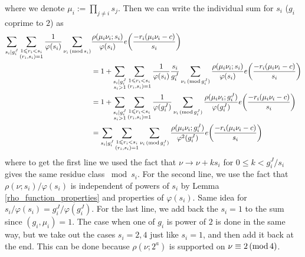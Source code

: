 \documentclass[12pt]{amsart}
\theoremstyle{definition}
\theoremstyle{definition}
\theoremstyle{remark}
\numberwithin{equation}{section}
\renewcommand{\leq}{\leqslant}
\renewcommand{\mod}[1]{\,({\rm mod}\,#1)}
\begin{document}
where we denote $\mu_i :=\prod_{j\not=i}s_j$. Then we can write the individual sum for $s_i$ ($g_i$ coprime to $2$) as
\begin{align*}
 \sum_{\substack{s_i| g_i^J}} \sum_{\substack{1\leq r_i < s_i \\ (r_i,s_i)=1}} \frac{1}{\varphi(s_i)} \sum_{\nu_i \mod{s_i}} &\frac{\rho(\mu_i\nu_i; s_i)}{\varphi(s_i)} e\bigg(\frac{-r_i(\mu_i\nu_i-c)}{s_i} \bigg) \\
 &= 1 + \sum_{\substack{s_i| g_i^J \\ s_i>1}} \sum_{\substack{1\leq r_i < s_i \\ (r_i,s_i)=1}} \frac{1}{\varphi(s_i)} \frac{s_i}{g_i^J} \sum_{\nu_i \mod{g_i^J}} \frac{\rho(\mu_i\nu_i;s_i)}{\varphi(s_i)} e\bigg(\frac{-r_i (\mu_i\nu_i-c)}{s_i} \bigg)  \\
&= 1 + \sum_{\substack{s_i| g_i^J \\ s_i>1}} \sum_{\substack{1\leq r_i < s_i \\ (r_i,s_i)=1}} \frac{1}{\varphi(g_i^J)}\sum_{\nu_i \mod{g_i^J}} \frac{\rho(\mu_i\nu_i;g_i^J)}{\varphi(g_i^J)} e\bigg(\frac{-r_i (\mu_i\nu_i-c)}{s_i} \bigg) \\
&= \sum_{\substack{s_i| g_i^J}} \sum_{\substack{1\leq r_i < s_i \\ (r_i,s_i)=1}} \sum_{\nu_i \mod{g_i^J}} \frac{\rho(\mu_i\nu_i;g_i^J)}{\varphi^2(g_i^J)} e\bigg(\frac{-r_i (\mu_i\nu_i-c)}{s_i} \bigg)
\end{align*}
where to get the first line we used the fact that $\nu \to \nu + ks_i$ for $0\leq k < g_i^J/s_i$ gives the same residue class $\bmod s_i$. For the second line, we use the fact that $\rho(\nu;s_i)/\varphi(s_i)$ is independent of powers of $s_i$ by Lemma \ref{rho_function_properties} and properties of $\varphi(s_i)$. Same idea for $s_i/\varphi(s_i) = g_i^J/\varphi(g_i^J)$. For the last line, we add back the $s_i=1$ to the sum since $(g_i,\mu_i)=1$. The case when one of $g_i$ is power of $2$ is done in the same way, but we take out the cases $s_i=2, 4$ just like $s_i=1$, and then add it back at the end. This can be done because $\rho(\nu;2^a)$ is supported on $\nu\equiv 2\mod 4$.
\end{document}
